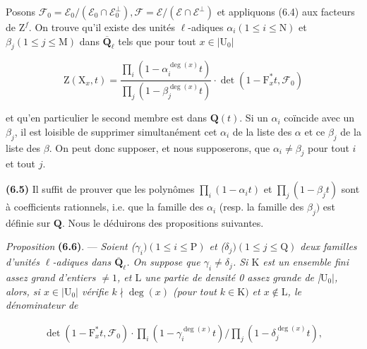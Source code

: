 \documentclass[10pt,leqno]{article}
\begin{document}
\noindent Posons \(\mathcal{F} _{0}=\mathcal{E} _{0}/(\mathcal{E} _{0}\cap \mathcal{E} _{0}^{\perp }), \mathcal{F} =\mathcal{E} /(\mathcal{E} \cap \mathcal{E} ^{\perp })\) et appliquons (6.4) aux facteurs de \(\mathrm{Z}^{f}\). On trouve qu’il existe des unités \(\ell \)-adiques \(\alpha _{i} (1\leq i\leq \mathrm{N})\) et \(\beta _{j} (1\leq j\leq \mathrm{M})\) dans \(\overline{\mathbf{Q}}_{\ell }\) tels que pour tout \(x\in |\mathrm{U}_{0}|\)\par

\[\mathrm{Z}(\mathrm{X}_{x},t)=\frac{\prod\limits _{i}(1- \alpha _{i}^{\operatorname{deg}(x)}t)}{\prod\limits _{j}(1- \beta _{j}^{\operatorname{deg}(x)}t)}\cdot \operatorname{det}(1- \mathrm{F}_{x}^{*}t,\mathcal{F} _{0})\]

\noindent et qu’en particulier le second membre est dans \(\mathbf{Q}(t)\). Si un \(\alpha _{i}\) coïncide avec un \(\beta _{j}\), il est loisible de supprimer simultanément cet \(\alpha _{i}\) de la liste des \(\alpha \) et ce \(\beta _{j}\) de la liste des \(\beta \). On peut donc supposer, et nous supposerons, que \(\alpha _{i}\ne \beta _{j}\) pour tout \(i\) et tout \(j\).\par

\noindent \textbf{(6.5)} Il suffit de prouver que les polynômes \(\prod _{i}(1- \alpha _{i} t)\) et \(\prod _{j}(1- \beta _{j} t)\) sont à coefficients rationnels, i.e. que la famille des \(\alpha _{i}\) (resp. la famille des \(\beta _{j})\) est définie sur \(\mathbf{Q}\). Nous le déduirons des propositions suivantes.\par

\noindent \emph{Proposition} \textbf{(6.6)}. — {\itshape Soient (\(\gamma _{i}) (1\leq i\leq \mathrm{P})\) et (\(\delta _{j}) (1\leq j\leq \mathrm{Q})\) deux familles d’unités \(\ell \)-adiques dans \(\overline{\mathbf{Q}}_{\ell }\). On suppose que \(\gamma _{i}\ne \delta _{j}\). Si \(\mathrm{K}\) est un ensemble fini assez grand d’entiers \(\ne 1\), et \(\mathrm{L}\) une partie de densité 0 assez grande de |\(\mathrm{U}_{0}|\), alors, si \(x\in |\mathrm{U}_{0}|\) vérifie \(k\nmid \operatorname{deg}(x)\) (pour tout \(k\in \mathrm{K})\) et \(x\notin \mathrm{L}\), le dénominateur de}\par

\begin{equation*}\begin{gathered}\operatorname{det}(1- \mathrm{F}_{x}^{*}t,\mathcal{F} _{0})\cdot \prod _{i}(1- \gamma _{i}^{\operatorname{deg}(x)}t)/\prod _{j}(1- \delta _{j}^{\operatorname{deg}(x)}t),\end{gathered}\tag{6.6.1}\end{equation*}
\end{document}
